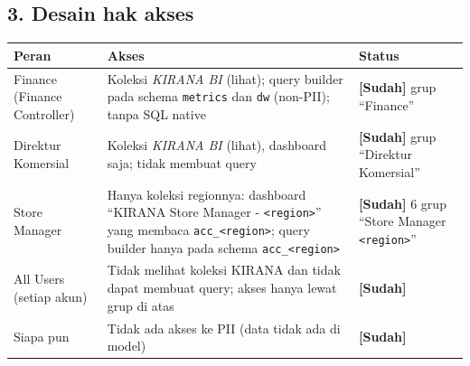\documentclass[10pt,a4paper]{article}
\begin{document}
\subsection{3. Desain hak akses}\label{desain-hak-akses}

{\def\LTcaptype{none} %
\begin{longtable}[]{@{}
  >{\raggedright\arraybackslash}p{}
  >{\raggedright\arraybackslash}p{}
  >{\raggedright\arraybackslash}p{}@{}}
\toprule\noalign{}
\begin{minipage}[b]{\linewidth}\raggedright
Peran
\end{minipage} & \begin{minipage}[b]{\linewidth}\raggedright
Akses
\end{minipage} & \begin{minipage}[b]{\linewidth}\raggedright
Status
\end{minipage} \\
\midrule\noalign{}
\endhead
\bottomrule\noalign{}
\endlastfoot
Finance (Finance Controller) & Koleksi \emph{KIRANA BI} (lihat); query builder pada schema \texttt{metrics} dan \texttt{dw} (non-PII); tanpa SQL native & \textbf{{[}Sudah{]}} grup ``Finance'' \\
Direktur Komersial & Koleksi \emph{KIRANA BI} (lihat), dashboard saja; tidak membuat query & \textbf{{[}Sudah{]}} grup ``Direktur Komersial'' \\
Store Manager & Hanya koleksi regionnya: dashboard ``KIRANA Store Manager - \texttt{\textless{}region\textgreater{}}'' yang membaca \texttt{acc\_\allowbreak{}\textless{}region\textgreater{}}; query builder hanya pada schema \texttt{acc\_\allowbreak{}\textless{}region\textgreater{}} & \textbf{{[}Sudah{]}} 6 grup ``Store Manager \texttt{\textless{}region\textgreater{}}'' \\
All Users (setiap akun) & Tidak melihat koleksi KIRANA dan tidak dapat membuat query; akses hanya lewat grup di atas & \textbf{{[}Sudah{]}} \\
Siapa pun & Tidak ada akses ke PII (data tidak ada di model) & \textbf{{[}Sudah{]}} \\
\end{longtable}
}
\end{document}
